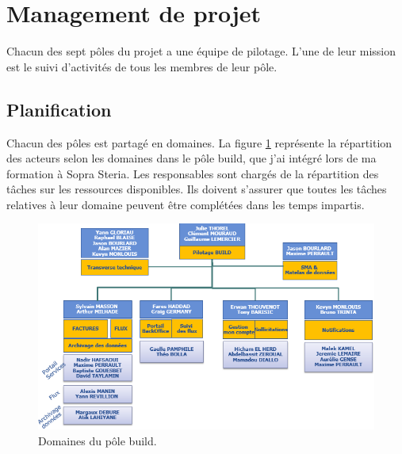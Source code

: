 \documentclass[12pt,a4paper]{article}
\begin{document}
\section{Management de projet}
Chacun des sept pôles du projet a une équipe de pilotage. L'une de leur mission est le suivi d'activités de tous les membres de leur pôle. 
\subsection{Planification}
Chacun des pôles est partagé en domaines. La figure \ref{domaines} représente la répartition des acteurs selon les domaines dans le pôle build, que j'ai intégré lors de ma formation à Sopra Steria. Les responsables sont chargés de la répartition des tâches sur les ressources disponibles. Ils doivent s'assurer que toutes les tâches relatives à leur domaine peuvent être complétées dans les temps impartis.
\begin{figure}[H]
	\begin{center}
		\includegraphics[width=\textwidth,keepaspectratio]{domaines.png}
		\caption{Domaines du pôle build.}
		\label{domaines}
	\end{center}
\end{figure}
\end{document}
